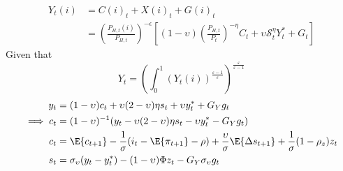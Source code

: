 \begin{align}
    Y_{t}(i) &= C(i)_t + X(i)_{t} + G(i)_t \\
&=\left(\frac{P_{H,t}(i)}{P_{H,t}}\right)^{-\epsilon}\left[ (1-\upsilon)\left(\frac{P_{H,t}}{P_t}\right)^{-\eta}C_t + \upsilon \mathcal{S}_t^{\eta}Y_t^* + G_t\right]
\end{align}
Given that
\begin{equation}
    Y_t = \left( \int_{0}^{1} (Y_t(i))^{\frac{\varepsilon-1}{\varepsilon}}\right)^{\frac{\varepsilon}{\varepsilon-1}}
\end{equation}
\begin{align}
    y_t &= (1-\upsilon)c_t + \upsilon(2-\upsilon)\eta s_t + \upsilon y_t^* + G_Y g_t\\
    \implies c_t &= (1-\upsilon)^{-1}(y_t - \upsilon(2-\upsilon)\eta s_t - \upsilon y_t^* - G_Y g_t)\\
    c_t &= \E \{ c_{t+1}\} - \frac{1}{\sigma}(i_t - \E \{ \pi_{t+1}\} - \rho) + \frac{\upsilon}{\sigma}\E \{ \Delta s_{t+1} \} + \frac{1}{\sigma}(1-\rho_z)z_t \\
    s_t &= \sigma_\upsilon(y_t - y^*_t) - (1-\upsilon)\Phi z_t - G_Y \sigma_\upsilon g_t\\
\end{align}
